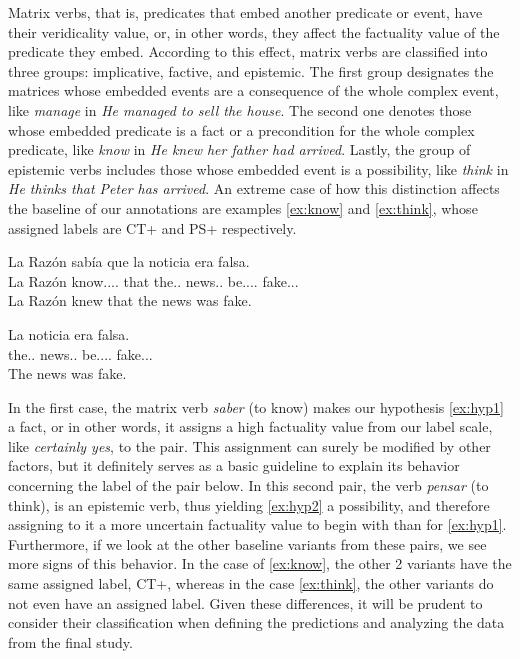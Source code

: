 Matrix verbs, that is, predicates that embed another predicate or event, have their veridicality value, or, in other words, they affect the factuality value of the predicate they embed. According to this effect, matrix verbs are classified into three groups: implicative, factive, and epistemic. The first group designates the matrices whose embedded events are a consequence of the whole complex event, like \textit{manage} in \textit{He managed to sell the house}. The second one denotes those whose embedded predicate is a fact or a precondition for the whole complex predicate, like \textit{know} in \textit{He knew her father had arrived}. Lastly, the group of epistemic verbs includes those whose embedded event is a possibility, like \textit{think} in \textit{He thinks that Peter has arrived}. An extreme case of how this distinction affects the baseline of our annotations are examples \ref{ex:know} and \ref{ex:think}, whose assigned labels are CT+ and PS+ respectively.\\

\begin{exe}
  \ex\label{ex:know}
    \begin{xlist}
      \item{\gll La Razón sabía que la noticia era falsa.\\ La Razón know.\Pst.\Ipfv.\Ind.\Tsg{} that the.\F.\Sg{} news.\F.\Sg{} be.\Pst.\Ipfv.\Ind.\Tsg{} fake.\Ptcp.\M.\Sg{}\\\glt La Razón knew that the news was fake.}
      \item{\gll La noticia era falsa.\\ the.\F.\Sg{} news.\F.\Sg{} be.\Pst.\Ipfv.\Ind.\Tsg{} fake.\Ptcp.\M.\Sg{}\\\glt The news was fake.} \label{ex:hyp1}
    \end{xlist}
\end{exe}

In the first case, the matrix verb \textit{saber} (to know) makes our hypothesis \ref{ex:hyp1} a fact, or in other words, it assigns a high factuality value from our label scale, like \textit{certainly yes}, to the pair. This assignment can surely be modified by other factors, but it definitely serves as a basic guideline to explain its behavior concerning the label of the pair below. In this second pair, the verb \textit{pensar} (to think), is an epistemic verb, thus yielding \ref{ex:hyp2} a possibility, and therefore assigning to it a more uncertain factuality value to begin with than for \ref{ex:hyp1}. Furthermore, if we look at the other baseline variants from these pairs, we see more signs of this behavior. In the case of \ref{ex:know}, the other 2 variants have the same assigned label, CT+, whereas in the case \ref{ex:think}, the other variants do not even have an assigned label. Given these differences, it will be prudent to consider their classification when defining the predictions and analyzing the data from the final study.\\

